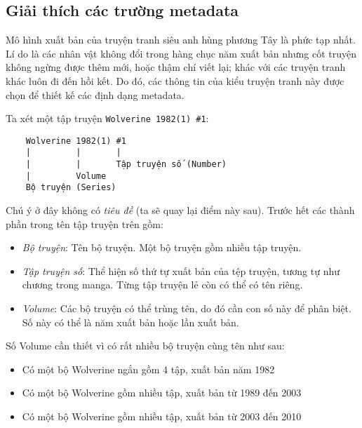 \documentclass[../../../thesis]{subfiles}
\begin{document}
\begin{appendices}

\appendixpageoff


\chapter{Giải thích các trường metadata}\label{app:metadata}

Mô hình xuất bản của truyện tranh siêu anh hùng phương Tây là phức tạp nhất. Lí
do là các nhân vật không đổi trong hàng chục năm xuất bản nhưng cốt truyện không
ngừng được thêm mới, hoặc thậm chí viết lại; khác với các truyện tranh khác luôn
đi đến hồi kết. Do đó, các thông tin của kiểu truyện tranh này được chọn để
thiết kế các định dạng metadata.

Ta xét một tập truyện \texttt{Wolverine\ 1982(1)\ \#1}:

\begin{verbatim}
    Wolverine 1982(1) #1
    |         |       |
    |         |       Tập truyện số (Number)
    |         Volume
    Bộ truyện (Series)
\end{verbatim}

Chú ý ở đây không có \emph{tiêu đề} (ta sẽ quay lại điểm này sau). Trước hết các
thành phần trong tên tập truyện trên gồm:

\begin{itemize}
    \item
        \emph{Bộ truyện}: Tên bộ truyện. Một bộ truyện gồm nhiều tập truyện.
    \item
        \emph{Tập truyện số}: Thể hiện số thứ tự xuất bản của tệp truyện, tương
        tự như chương trong manga. Từng tập truyện lẻ còn có thể có tên riêng.
    \item
        \emph{Volume}: Các bộ truyện có thể trùng tên, do đó cần con số này để
        phân biệt. Số này có thể là năm xuất bản hoặc lần xuất bản.
\end{itemize}

Số Volume cần thiết vì có rất nhiều bộ truyện cùng tên như sau:

\begin{itemize}
    \item
        Có một bộ Wolverine ngắn gồm 4 tập, xuất bản năm 1982
    \item
        Có một bộ Wolverine gồm nhiều tập, xuất bản từ 1989 đến 2003
    \item
        Có một bộ Wolverine gồm nhiều tập, xuất bản từ 2003 đến 2010
\end{itemize}


\end{appendices}
\end{document}
